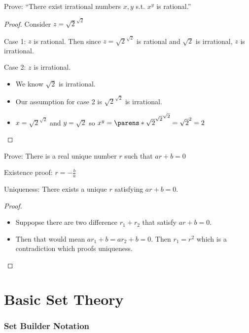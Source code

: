 \documentclass[8pt]{scrreprt}
\begin{document}
\begin{landscape}
\begin{multicols*}{3}
Prove: ``There exist irrational numbers $x,y$ s.t. $x^y$ is rational.''

\begin{proof}
	Consider $z=\sqrt{2}^{\sqrt{2}}$

	Case 1: $z$ is rational.
	Then since $z=\sqrt{2}^{\sqrt{2}}$ is rational and $\sqrt{2}$ is irrational, $z$ is irrational.

	Case 2: $z$ is irrational.
	\begin{itemize}
		\item We know $\sqrt{2}$ is irrational.
		\item Our assumption for case 2 is $\sqrt{2}^{\sqrt{2}}$ is irrational.
		\item $x=\sqrt{2}^{\sqrt{2}}$ and $y={\sqrt{2}}$ so
		      $x^y=\parens*{\sqrt{2}^{\sqrt{2}}}^{\sqrt{2}} = \sqrt{2}^2=2$
	\end{itemize}
\end{proof}

\begin{example}
	Prove: There is a real unique number $r$ such that $ar+b=0$

	Existence proof: $r=-\frac{b}{a}$

\end{example}

\begin{example}
	Uniqueness: There exists a unique $r$ satisfying $ar+b=0$.

	\begin{proof}
		\begin{itemize}
			\item Suppopse there are two difference $r_1+r_2$ that satisfy $ar+b=0$.
			\item Then that would mean $ar_1+b=ar_2+b=0$. Then $r_1=r^2$ which is a contradiction which proofs uniqueness.
		\end{itemize}
	\end{proof}
\end{example}

\chapter{Basic Set Theory}

\subsection{Set Builder Notation}


\end{multicols*}
\end{landscape}
\end{document}
